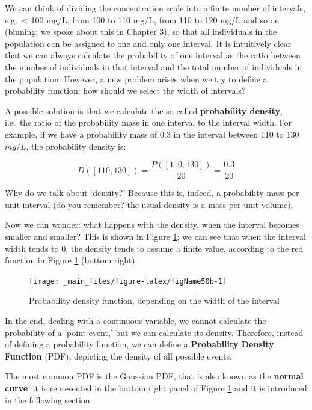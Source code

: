 \documentclass[a4paper,12pt,oneside]{book}
\begin{document}
We can think of dividing the concentration scale into a finite number of intervals, e.g.~\textless{} 100 mg/L, from 100 to 110 mg/L, from 110 to 120 mg/L and so on (binning; we spoke about this in Chapter 3), so that all individuals in the population can be assigned to one and only one interval. It is intuitively clear that we can always calculate the probability of one interval as the ratio between the number of individuals in that interval and the total number of individuals in the population. However, a new problem arises when we try to define a probability function: how should we select the width of intervals?

A possible solution is that we calculate the so-called \textbf{probability density}, i.e.~the ratio of the probability mass in one interval to the interval width. For example, if we have a probability mass of 0.3 in the interval between 110 to 130 \(mg/L\), the probability density is:

\[D([110, 130]) = \frac{P([110,130])}{20} = \frac{0.3}{20}\]

Why do we talk about `density?' Because this is, indeed, a probability mass per unit interval (do you remember? the usual density is a mass per unit volume).

Now we can wonder: what happens with the density, when the interval becomes smaller and smaller? This is shown in Figure \ref{fig:figName50b}; we can see that when the interval width tends to 0, the density tends to assume a finite value, according to the red function in Figure \ref{fig:figName50b} (bottom right).

\begin{figure}

{\centering \texttt{[image: \_main\_files/figure-latex/figName50b-1]} 

}

\caption{Probability density function, depending on the width of the interval}\label{fig:figName50b}
\end{figure}

In the end, dealing with a continuous variable, we cannot calculate the probability of a `point-event,' but we can calculate its density. Therefore, instead of defining a probability function, we can define a \textbf{Probability Density Function} (PDF), depicting the density of all possible events.

The most common PDF is the Gaussian PDF, that is also known as the \textbf{normal curve}; it is represented in the bottom right panel of Figure \ref{fig:figName50b} and it is introduced in the following section.
\end{document}
